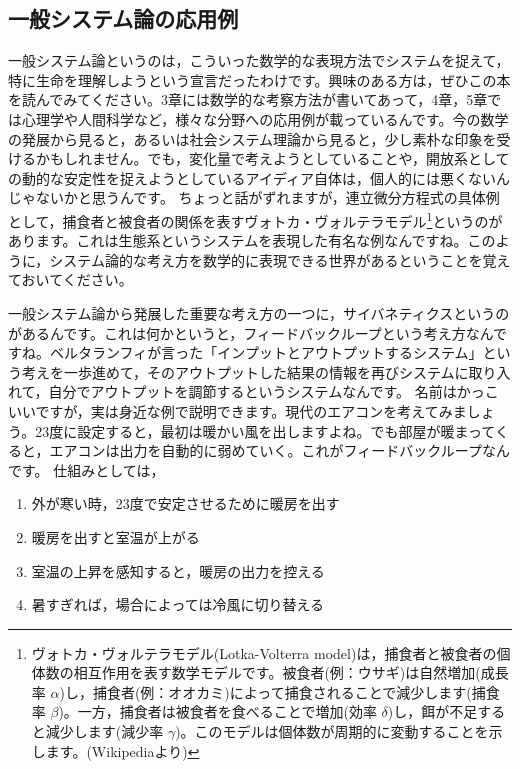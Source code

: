 \documentclass{ltjsbook}
\begin{document}
\subsection{一般システム論の応用例}
一般システム論というのは，こういった数学的な表現方法でシステムを捉えて，特に生命を理解しようという宣言だったわけです。興味のある方は，ぜひこの本を読んでみてください。3章には数学的な考察方法が書いてあって，4章，5章では心理学や人間科学など，様々な分野への応用例が載っているんです。今の数学の発展から見ると，あるいは社会システム理論から見ると，少し素朴な印象を受けるかもしれません。でも，変化量で考えようとしていることや，開放系としての動的な安定性を捉えようとしているアイディア自体は，個人的には悪くないんじゃないかと思うんです。
ちょっと話がずれますが，連立微分方程式の具体例として，捕食者と被食者の関係を表すヴォトカ・ヴォルテラモデル\footnote{ヴォトカ・ヴォルテラモデル(Lotka-Volterra model)は，捕食者と被食者の個体数の相互作用を表す数学モデルです。被食者(例：ウサギ)は自然増加(成長率 \(\alpha\))し，捕食者(例：オオカミ)によって捕食されることで減少します(捕食率 \(\beta\))。一方，捕食者は被食者を食べることで増加(効率 \(\delta\))し，餌が不足すると減少します(減少率 \(\gamma\))。このモデルは個体数が周期的に変動することを示します。(Wikipediaより)}というのがあります。これは生態系というシステムを表現した有名な例なんですね。このように，システム論的な考え方を数学的に表現できる世界があるということを覚えておいてください。

一般システム論から発展した重要な考え方の一つに，サイバネティクスというのがあるんです。これは何かというと，フィードバックループという考え方なんですね。ベルタランフィが言った「インプットとアウトプットするシステム」という考えを一歩進めて，そのアウトプットした結果の情報を再びシステムに取り入れて，自分でアウトプットを調節するというシステムなんです。
名前はかっこいいですが，実は身近な例で説明できます。現代のエアコンを考えてみましょう。23度に設定すると，最初は暖かい風を出しますよね。でも部屋が暖まってくると，エアコンは出力を自動的に弱めていく。これがフィードバックループなんです。
仕組みとしては，
\begin{enumerate}
    \item 外が寒い時，23度で安定させるために暖房を出す
    \item 暖房を出すと室温が上がる
    \item 室温の上昇を感知すると，暖房の出力を控える
    \item 暑すぎれば，場合によっては冷風に切り替える
\end{enumerate}
\end{document}
